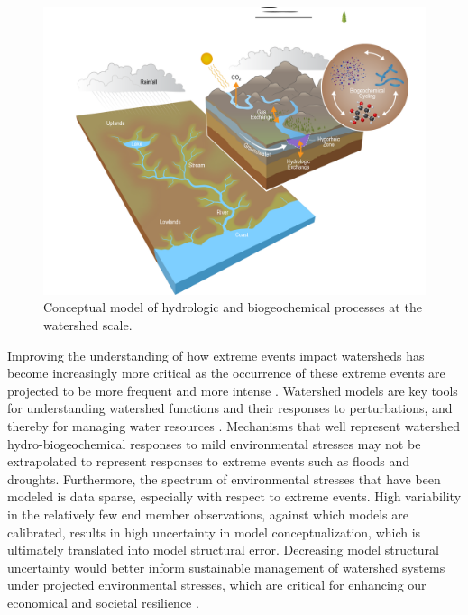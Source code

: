 \documentclass[preprint,review, 12pt]{elsarticle}
\begin{document}
\begin{figure}[hp]
\centering\includegraphics[width=1.0\linewidth]{EED0542_watershedModel.png}
\caption{Conceptual model of hydrologic and biogeochemical processes at the watershed scale.}
\end{figure}

Improving the understanding of how extreme events impact watersheds has become increasingly more critical as the occurrence of these extreme events are projected to be more frequent and more intense \citep{IPCC2012}. Watershed models are key tools for understanding watershed functions and their responses to perturbations, and thereby for managing water resources \citep{Weiler2004, Burt2005, Beven1997, Jones1993}. Mechanisms that well represent watershed hydro-biogeochemical responses to mild environmental stresses may not be extrapolated to represent responses to extreme events such as floods and droughts. Furthermore, the spectrum of environmental stresses that have been modeled is data sparse, especially with respect to extreme events. High variability in the relatively few end member observations, against which models are calibrated, results in high uncertainty in model conceptualization, which is ultimately translated into model structural error. Decreasing model structural uncertainty would better inform sustainable management of watershed systems under projected environmental stresses, which are critical for enhancing our economical and societal resilience \citep{Srinivasan2017, McDonnell2018b}.

\end{document}
